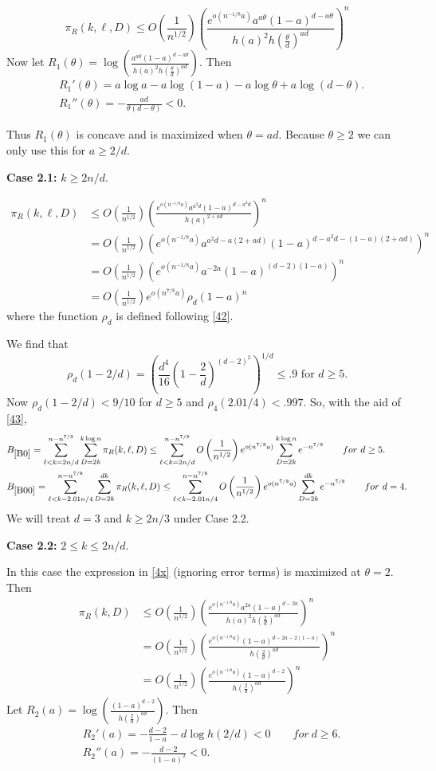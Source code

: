 \documentclass[11pt]{article}
\def\th{\theta}
\def\p{\pi}
\def\r{\rho}
\newcommand{\brac}[1]{\left(#1\right)}
\newcommand{\bfrac}[2]{\brac{\frac{#1}{#2}}}
\newcommand{\beq}[1]{\begin{equation}\label{#1}}
\newcommand{\eeq}{\end{equation}}
\begin{document}
\beq{4x}
\p_R(k,\ell,D)\leq O\bfrac{1}{n^{1/2}}\bfrac{e^{o(n^{-1/8}a)}a^{a\th}(1-a)^{d-a\th}}{h(a)^2h\bfrac{\th}{d}^{ad}}^n
\eeq
Now let $R_1(\th)=\log\bfrac{a^{a\th}(1-a)^{d-a\th}}{h(a)^2h\bfrac{\th}{d}^{ad}}$. Then
\begin{align*}
&R_1'(\th)=a\log a - a\log (1-a)-a\log\th+a\log(d-\th).\\
&R_1''(\th)=-\frac{ad}{\th(d-\th)}<0.
\end{align*}


Thus $R_1(\th)$ is concave and is maximized when $\th=ad$. Because $\th\geq 2$ we can only use this for 
$a\geq 2/d$. 

{\bf Case 2.1:} $k\geq 2n/d$.

\begin{align}
\p_R(k,\ell,D)&\leq O\bfrac{1}{n^{1/2}}\bfrac{e^{o(n^{-1/8}a)}a^{a^2d}(1-a)^{d-a^2d}}{h(a)^{2+ad}}^n\nonumber\\
&= O\bfrac{1}{n^{1/2}}\brac{e^{o(n^{-1/8}a)}a^{a^2d-a(2+ad)}(1-a)^{d-a^2d-(1-a)(2+ad)}}^n\nonumber\\
&= O\bfrac{1}{n^{1/2}}\brac{e^{o(n^{-1/8}a)}a^{-2a}(1-a)^{(d-2)(1-a)}}^n\nonumber\\
&= O\bfrac{1}{n^{1/2}}e^{o(n^{7/8}a)}\r_d(1-a)^n\label{1-a}
\end{align}
where the function $\r_d$ is defined following \eqref{42}.

We find that 
\beq{d=5}
\r_d(1-2/d)=\brac{\frac{d^4}{16}\brac{1-\frac{2}{d}}^{(d-2)^2}}^{1/d}\leq .9\text{ for }d\geq 5.
\eeq
Now $\r_d(1-2/d)<9/10$ for $d\geq 5$ and $\r_4(2.01/4)<.997$. So, with the aid of \eqref{43},
\begin{align}
&B_{\ref{B0}}=\sum_{\ell<k=2n/d}^{n-n^{7/8}}
\sum_{D=2k}^{k\log n}\p_R(k,\ell,D)\leq \sum_{\ell<k=2n/d}^{n-n^{7/8}}O\bfrac{1}{n^{1/2}}e^{o(n^{7/8}a)}
\sum_{D=2k}^{k\log n}e^{-n^{7/8}}
\qquad for\ d\geq 5.\label{B0}\\
&B_{\ref{B00}}=\sum_{\ell<k=2.01n/4}^{n-n^{7/8}}
\sum_{D=2k}^{dk}\p_R(k,\ell,D)\leq \sum_{\ell<k=2.01n/4}^{n-n^{7/8}}O\bfrac{1}{n^{1/2}}e^{o(n^{7/8}a)}
\sum_{D=2k}^{dk}e^{-n^{7/8}}
\qquad for\ d=4.\label{B00}
\end{align}
We will treat $d=3$ and $k\geq 2n/3$ under Case 2.2.

{\bf Case 2.2:} $2\leq k\leq 2n/d$.

In this case the expression in \eqref{4x} (ignoring error terms) is maximized at $\th=2$. Then
\begin{align*}
\p_R(k,D)&\leq O\bfrac{1}{n^{1/2}}\bfrac{e^{o(n^{-1/8}a)}a^{2a}(1-a)^{d-2a}}{h(a)^2h\bfrac{2}{d}^{ad}}^n\\
&= O\bfrac{1}{n^{1/2}}\bfrac{e^{o(n^{-1/8}a)}(1-a)^{d-2a-2(1-a)}}{h\bfrac{2}{d}^{ad}}^n\\
&= O\bfrac{1}{n^{1/2}}\bfrac{e^{o(n^{-1/8}a)}(1-a)^{d-2}}{h\bfrac{2}{d}^{ad}}^n
\end{align*}
Let $R_2(a)=\log\bfrac{(1-a)^{d-2}}{h\bfrac{2}{d}^{ad}}$. Then
\begin{align*}
&R_2'(a)=-\frac{d-2}{1-a}-d\log h(2/d)<0\qquad for\ d\geq 6.\\
&R_2''(a)=-\frac{d-2}{(1-a)^2}<0.
\end{align*}
\end{document}
